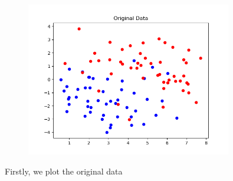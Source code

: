 \documentclass[12pt]{article}
\begin{document}
\begin{enumerate}[label=(\alph*)]
{        \begin{figure}[H]
            \centering
            \includegraphics[width=0.80\textwidth]{figure/original_data.png}
        \end{figure}

        Firstly, we plot the original data \\
    }
    
    \end{enumerate}
\end{document}
